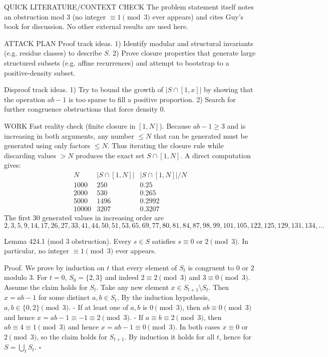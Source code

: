 QUICK LITERATURE/CONTEXT CHECK
The problem statement itself notes an obstruction mod $3$ (no integer $\equiv 1\pmod 3$ ever appears) and cites Guy’s book for discussion. No other external results are used here.

ATTACK PLAN
Proof track ideas.
1) Identify modular and structural invariants (e.g. residue classes) to describe $S$.
2) Prove closure properties that generate large structured subsets (e.g. affine recurrences) and attempt to bootstrap to a positive-density subset.

Disproof track ideas.
1) Try to bound the growth of $|S\cap[1,x]|$ by showing that the operation $ab-1$ is too sparse to fill a positive proportion.
2) Search for further congruence obstructions that force density $0$.

WORK
Fast reality check (finite closure in $[1,N]$).
Because $ab-1\ge 3$ and is increasing in both arguments, any number $\le N$ that can be generated must be generated using only factors $\le N$.
Thus iterating the closure rule while discarding values $>N$ produces the exact set $S\cap[1,N]$.
A direct computation gives:
\[
\begin{array}{c|c|c}
 N & |S\cap[1,N]| & |S\cap[1,N]|/N\\\hline
 1000&250&0.25\\
 2000&530&0.265\\
 5000&1496&0.2992\\
 10000&3207&0.3207
\end{array}
\]
The first $30$ generated values in increasing order are
\[
2,3,5,9,14,17,26,27,33,41,44,50,51,53,65,69,77,80,81,84,87,98,99,101,105,122,125,129,131,134,\dots
\]

Lemma 424.1 (mod $3$ obstruction).
Every $s\in S$ satisfies $s\equiv 0$ or $2\pmod 3$. In particular, no integer $\equiv 1\pmod 3$ ever appears.

Proof.
We prove by induction on $t$ that every element of $S_t$ is congruent to $0$ or $2$ modulo $3$.
For $t=0$, $S_0=\{2,3\}$ and indeed $2\equiv 2\pmod 3$ and $3\equiv 0\pmod 3$.
Assume the claim holds for $S_t$.
Take any new element $x\in S_{t+1}\setminus S_t$. Then $x=ab-1$ for some distinct $a,b\in S_t$.
By the induction hypothesis, $a,b\in\{0,2\}\pmod 3$.
- If at least one of $a,b$ is $0\pmod 3$, then $ab\equiv 0\pmod 3$ and hence $x=ab-1\equiv -1\equiv 2\pmod 3$.
- If $a\equiv b\equiv 2\pmod 3$, then $ab\equiv 4\equiv 1\pmod 3$ and hence $x=ab-1\equiv 0\pmod 3$.
In both cases $x\equiv 0$ or $2\pmod 3$, so the claim holds for $S_{t+1}$.
By induction it holds for all $t$, hence for $S=\bigcup_t S_t$.
\hfill $\square$

